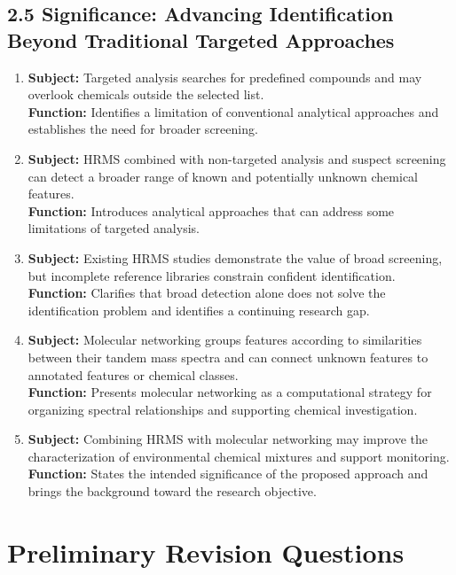 \documentclass[11pt]{article}
\begin{document}
\begin{doublespace}
    \subsection{2.5 Significance: Advancing Identification Beyond Traditional Targeted Approaches}
        \begin{enumerate}[label=\textbf{Paragraph \arabic*:}, start=15, leftmargin=*]
            \item \textbf{Subject:} Targeted analysis searches for predefined compounds and may overlook chemicals outside the selected list.\\
            \textbf{Function:} Identifies a limitation of conventional analytical approaches and establishes the need for broader screening.
            \item \textbf{Subject:} HRMS combined with non-targeted analysis and suspect screening can detect a broader range of known and potentially unknown chemical features.\\
            \textbf{Function:} Introduces analytical approaches that can address some limitations of targeted analysis.
            \item \textbf{Subject:} Existing HRMS studies demonstrate the value of broad screening, but incomplete reference libraries constrain confident identification.\\
            \textbf{Function:} Clarifies that broad detection alone does not solve the identification problem and identifies a continuing research gap.
            \item \textbf{Subject:} Molecular networking groups features according to similarities between their tandem mass spectra and can connect unknown features to annotated features or chemical classes.\\
            \textbf{Function:} Presents molecular networking as a computational strategy for organizing spectral relationships and supporting chemical investigation.
            \item \textbf{Subject:} Combining HRMS with molecular networking may improve the characterization of environmental chemical mixtures and support monitoring.\\
            \textbf{Function:} States the intended significance of the proposed approach and brings the background toward the research objective.
        \end{enumerate}

\section{Preliminary Revision Questions}


\end{doublespace}
\end{document}
